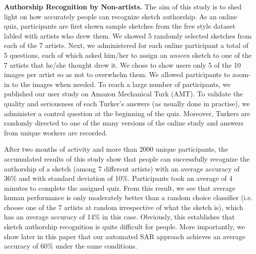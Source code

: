 


\noindent\textbf{Authorship Recognition by Non-artists.} The aim of this study is to shed light on how accurately people can recognize sketch authorship. As an online quiz, participants are first shown sample sketches from the free style dataset labled with artists who drew them. We showed 5 randomly selected sketches from each of the 7 artists. Next, we administered for each online participant a total of 5 questions, each of which asked him/her to assign an \emph{unseen} sketch to one of the 7 artists that he/she thought drew it. We chose to show users only 5 of the 10 images per artist so as not to overwhelm them. We allowed participants to zoom-in to the images when needed. To reach a large number of participants, we published our user study on Amazon Mechanical Turk (AMT). To validate the quality and seriousness of each Turker's answers (as usually done in practise), we administer a control question at the beginning of the quiz. Moreover, Turkers are randomly directed to one of the many versions of the online study and answers from unique workers are recorded.

After two months of activity and more than 2000 unique participants, the accumulated results of this study show that people can successfully recognize the authorship of a sketch (among 7 different artists) with an average accuracy of 36\% and with standard deviation of 10\%. Participants took an average of 4 minutes to complete the assigned quiz. From this result, we see that average human performance is only moderately better than a random choice classifier (i.e. choose one of the 7 artists at random irrespective of what the sketch is), which has an average accuracy of 14\% in this case. Obviously, this establishes that sketch authorship recognition is quite difficult for people. More importantly, we show later in this paper that our automated SAR approach achieves an average accuracy of 60\% under the same conditions.

